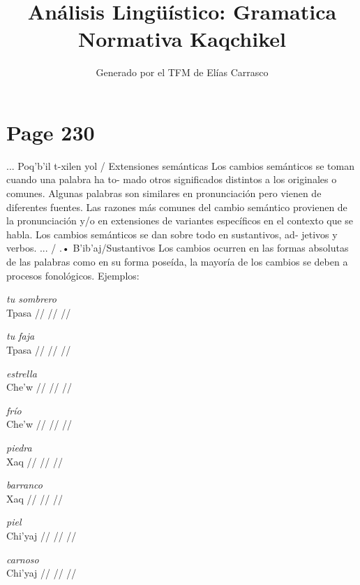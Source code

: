 \documentclass{article}%
\title{Análisis Lingüístico: Gramatica Normativa Kaqchikel}%
\author{Generado por el TFM de Elías Carrasco}%
\begin{document}
%
\normalsize%
\maketitle%
\section{Page 230}%
\label{sec:Page230}%
...     Poq'b'il t{-}xilen yol / Extensiones semánticas %
Los cambios semánticos se toman cuando una palabra ha to{-} %
mado otros significados distintos a los originales o comunes. %
Algunas palabras son similares en pronunciación pero vienen %
de diferentes fuentes. %
Las razones más comunes del cambio semántico provienen de %
la pronunciación y/o en extensiones de variantes específicos %
en el contexto que se habla. %
Los cambios semánticos se dan sobre todo en sustantivos, ad{-} %
jetivos y verbos. %
...    / .•    B'ib'aj/Sustantivos %
Los cambios ocurren en las formas absolutas de las palabras %
como en su forma poseída, la mayoría de los cambios se deben %
a procesos fonológicos. %
Ejemplos: %
\par\medskip%
\ex
\textit{tu sombrero} \\
\begingl
\gla Tpasa //
\glb  //
\glc  //
\endgl
\xe
%
\medskip%
\par\medskip%
\ex
\textit{tu faja} \\
\begingl
\gla Tpasa //
\glb  //
\glc  //
\endgl
\xe
%
\medskip%
\par\medskip%
\ex
\textit{estrella} \\
\begingl
\gla Che'w //
\glb  //
\glc  //
\endgl
\xe
%
\medskip%
\par\medskip%
\ex
\textit{frío} \\
\begingl
\gla Che'w //
\glb  //
\glc  //
\endgl
\xe
%
\medskip%
\par\medskip%
\ex
\textit{piedra} \\
\begingl
\gla Xaq //
\glb  //
\glc  //
\endgl
\xe
%
\medskip%
\par\medskip%
\ex
\textit{barranco} \\
\begingl
\gla Xaq //
\glb  //
\glc  //
\endgl
\xe
%
\medskip%
\par\medskip%
\ex
\textit{piel} \\
\begingl
\gla Chi'yaj //
\glb  //
\glc  //
\endgl
\xe
%
\medskip%
\par\medskip%
\ex
\textit{carnoso} \\
\begingl
\gla Chi'yaj //
\glb  //
\glc  //
\endgl
\xe
%

%
\end{document}
